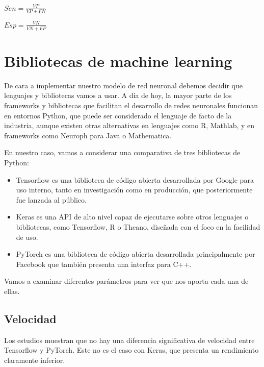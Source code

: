 \begin{math}
Sen = \frac{VP}{VP + FN}
\end{math}

\begin{math}
Esp = \frac{VN}{VN + FP}
\end{math}

\section{Bibliotecas de machine learning}\label{sec:bibliotecas-de-machine-learning}

De cara a implementar nuestro modelo de red neuronal debemos decidir que
lenguajes y bibliotecas vamos a usar. A día de hoy, la mayor parte de los
frameworks y bibliotecas que facilitan el desarrollo de redes neuronales
funcionan en entornos Python, que puede ser considerado el lenguaje de
facto de la industria, aunque existen otras alternativas en lenguajes
como R, Mathlab, y en frameworks como Neuroph para Java o Mathematica.

En nuestro caso, vamos a considerar una comparativa de tres bibliotecas de Python:

\begin{itemize}
	\itemsep1pt\parskip0pt
	\item
	Tensorflow es una biblioteca de código abierta desarrollada por Google
	para uso interno, tanto en investigación como en producción, que
	posteriormente fue lanzada al público.\\
	\item
	Keras es una API de alto nivel capaz de ejecutarse sobre otros
	lenguajes o bibliotecas, como Tensorflow, R o Theano, diseñada con el
	foco en la facilidad de uso.\\
	\item
	PyTorch es una biblioteca de código abierta desarrollada principalmente
	por Facebook que también presenta una interfaz para C++.
\end{itemize}

Vamos a examinar diferentes parámetros para ver que nos aporta cada una
de ellas.

\subsection{Velocidad}\label{velocidad}

Los estudios muestran que no hay una diferencia significativa de
velocidad entre Tensorflow y PyTorch. Este no es el caso con Keras, que
presenta un rendimiento claramente inferior.

